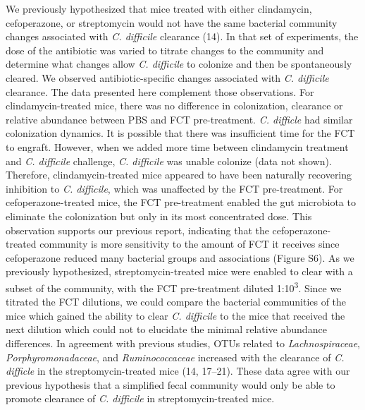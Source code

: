 \documentclass[
  12pt,
]{article}
\begin{document}
We previously hypothesized that mice treated with either clindamycin,
cefoperazone, or streptomycin would not have the same bacterial
community changes associated with \emph{C. difficile} clearance (14). In
that set of experiments, the dose of the antibiotic was varied to
titrate changes to the community and determine what changes allow
\emph{C. difficile} to colonize and then be spontaneously cleared. We
observed antibiotic-specific changes associated with \emph{C. difficile}
clearance. The data presented here complement those observations. For
clindamycin-treated mice, there was no difference in colonization,
clearance or relative abundance between PBS and FCT pre-treatment.
\emph{C. difficle} had similar colonization dynamics. It is possible
that there was insufficient time for the FCT to engraft. However, when
we added more time between clindamycin treatment and \emph{C. difficile}
challenge, \emph{C. difficile} was unable colonize (data not shown).
Therefore, clindamycin-treated mice appeared to have been naturally
recovering inhibition to \emph{C. difficile}, which was unaffected by
the FCT pre-treatment. For cefoperazone-treated mice, the FCT
pre-treatment enabled the gut microbiota to eliminate the colonization
but only in its most concentrated dose. This observation supports our
previous report, indicating that the cefoperazone-treated community is
more sensitivity to the amount of FCT it receives since cefoperazone
reduced many bacterial groups and associations (Figure S6). As we
previously hypothesized, streptomycin-treated mice were enabled to clear
with a subset of the community, with the FCT pre-treatment diluted
1:10\textsuperscript{3}. Since we titrated the FCT dilutions, we could
compare the bacterial communities of the mice which gained the ability
to clear \emph{C. difficile} to the mice that received the next dilution
which could not to elucidate the minimal relative abundance differences.
In agreement with previous studies, OTUs related to
\emph{Lachnospiraceae}, \emph{Porphyromonadaceae}, and
\emph{Ruminococcaceae} increased with the clearance of \emph{C.
difficle} in the streptomycin-treated mice (14, 17--21). These data
agree with our previous hypothesis that a simplified fecal community
would only be able to promote clearance of \emph{C. difficile} in
streptomycin-treated mice.
\end{document}
